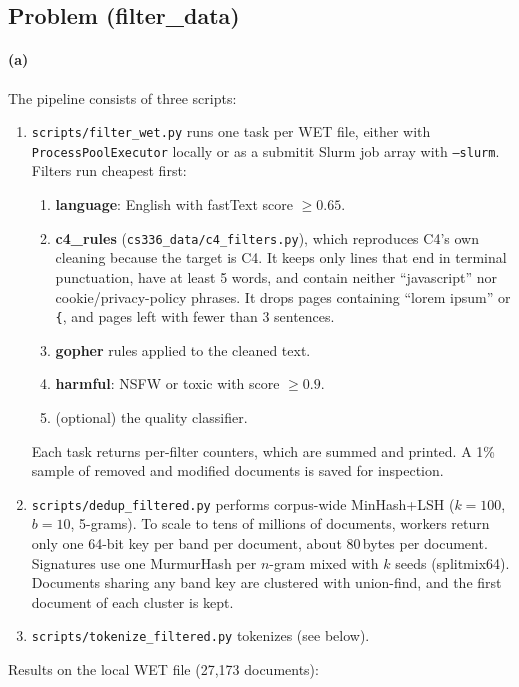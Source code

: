 \documentclass[11pt]{article}
\begin{document}
\subsection*{Problem (filter\_data)}

\paragraph{(a)} The pipeline consists of three scripts:
\begin{enumerate}
  \item \texttt{scripts/filter\_wet.py} runs one task per WET file, either with \texttt{ProcessPoolExecutor}
  locally or as a submitit Slurm job array with \texttt{--slurm}. Filters run cheapest first:
  \begin{enumerate}
    \item \textbf{language}: English with fastText score $\geq 0.65$.
    \item \textbf{c4\_rules} (\texttt{cs336\_data/c4\_filters.py}), which reproduces C4's own cleaning because the target is C4.
    It keeps only lines that end in terminal punctuation, have at least 5 words, and contain neither ``javascript'' nor
    cookie/privacy-policy phrases. It drops pages containing ``lorem ipsum'' or \texttt{\{}, and pages left with fewer
    than 3 sentences.
    \item \textbf{gopher} rules applied to the cleaned text.
    \item \textbf{harmful}: NSFW or toxic with score $\geq 0.9$.
    \item (optional) the quality classifier.
  \end{enumerate}
  Each task returns per-filter counters, which are summed and printed. A 1\% sample of removed and modified
  documents is saved for inspection.
  \item \texttt{scripts/dedup\_filtered.py} performs corpus-wide MinHash+LSH ($k=100$, $b=10$, 5-grams). To scale to tens of
  millions of documents, workers return only one 64-bit key per band per document, about 80\,bytes per
  document. Signatures use one MurmurHash per $n$-gram mixed with $k$ seeds (splitmix64). Documents sharing any
  band key are clustered with union-find, and the first document of each cluster is kept.
  \item \texttt{scripts/tokenize\_filtered.py} tokenizes (see below).
\end{enumerate}

\noindent Results on the local WET file (27{,}173 documents):
\end{document}

